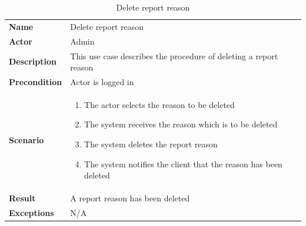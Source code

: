 \begin{table}[ht]
    \caption{Delete report reason}
    \begin{tabular}{|L{5cm}|L{10cm}|}
        \toprule
        \textbf{Name}         & Delete report reason                                              \\
        \textbf{Actor}        & Admin                                                             \\
        \textbf{Description}  & This use case describes the procedure of deleting a report reason \\
        \textbf{Precondition} & Actor is logged in                                                \\
        \textbf{Scenario} &
        \vspace{-0.75cm}
        \begin{enumerate}
            \setlength\itemsep{-0.5em}
            \item The actor selects the reason to be deleted
            \item The system receives the reason which is to be deleted
            \item The system deletes the report reason
            \item The system notifies the client that the reason has been deleted
        \end{enumerate} \\[-0.5cm]
        \textbf{Result}       & A report reason has been deleted                                  \\
        \textbf{Exceptions}   & N/A                                                               \\
        \bottomrule
    \end{tabular}
    \label{tab:table33}
\end{table}

